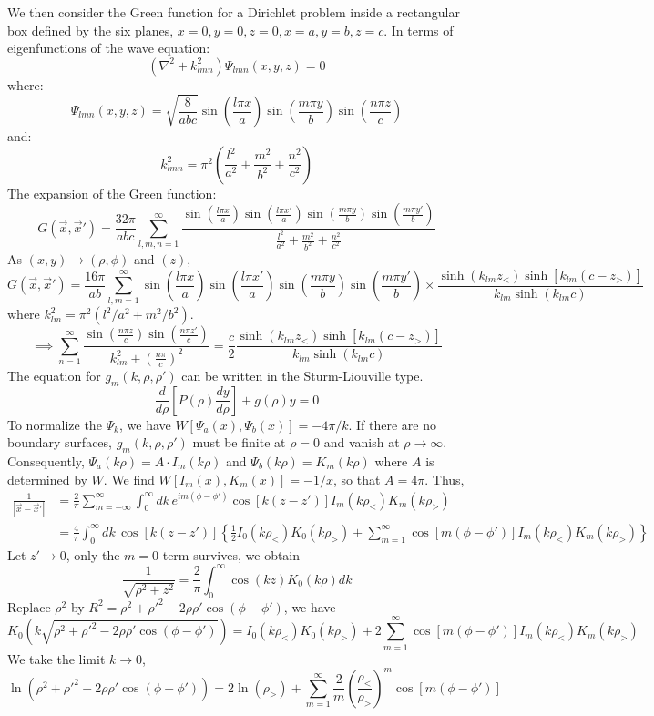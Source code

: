 \documentclass{article}
\begin{document}
	We then consider the Green function for a Dirichlet problem inside a rectangular box defined by the six planes, $x=0, y=0, z=0, x=a, y=b, z=c$.
	In terms of eigenfunctions of the wave equation:
	\[
	(\nabla^2 + k_{lmn}^2)\Psi_{lmn}(x,y,z) = 0
	\]
	where:
	\[
	\Psi_{lmn}(x,y,z) = \sqrt{\frac{8}{abc}} \sin\left(\frac{l\pi x}{a}\right) \sin\left(\frac{m\pi y}{b}\right) \sin\left(\frac{n\pi z}{c}\right)
	\]
	and:
	\[
	k_{lmn}^2 = \pi^2 \left(\frac{l^2}{a^2} + \frac{m^2}{b^2} + \frac{n^2}{c^2}\right)
	\]
	The expansion of the Green function:
	\[
	G(\vec{x}, \vec{x}') = \frac{32\pi}{abc} \sum_{l,m,n=1}^{\infty} \frac{\sin(\frac{l\pi x}{a})\sin(\frac{l\pi x'}{a})\sin(\frac{m\pi y}{b})\sin(\frac{m\pi y'}{b})}{\frac{l^2}{a^2} + \frac{m^2}{b^2} + \frac{n^2}{c^2}}
	\]
	As $(x,y) \to (\rho, \phi)$ and $(z)$,
	\[
	G(\vec{x}, \vec{x}') = \frac{16\pi}{ab} \sum_{l,m=1}^{\infty} \sin\left(\frac{l\pi x}{a}\right)\sin\left(\frac{l\pi x'}{a}\right)\sin\left(\frac{m\pi y}{b}\right)\sin\left(\frac{m\pi y'}{b}\right) \times \frac{\sinh(k_{lm} z_<) \sinh[k_{lm}(c-z_>)]}{k_{lm} \sinh(k_{lm} c)}
	\]
	where $k_{lm}^2 = \pi^2(l^2/a^2 + m^2/b^2)$.
	\[
	\implies \sum_{n=1}^{\infty} \frac{\sin(\frac{n\pi z}{c}) \sin(\frac{n\pi z'}{c})}{k_{lm}^2 + (\frac{n\pi}{c})^2} = \frac{c}{2} \frac{\sinh(k_{lm} z_<) \sinh[k_{lm}(c-z_>)]}{k_{lm} \sinh(k_{lm} c)}
	\]
	The equation for $g_m(k, \rho, \rho')$ can be written in the Sturm-Liouville type.
	\[
	\frac{d}{d\rho}\left[ P(\rho) \frac{dy}{d\rho} \right] + g(\rho)y = 0
	\]
	To normalize the $\Psi_k$, we have $W[\Psi_a(x), \Psi_b(x)] = -4\pi/k$.
	If there are no boundary surfaces, $g_m(k, \rho, \rho')$ must be finite at $\rho=0$ and vanish at $\rho \to \infty$.
	Consequently, $\Psi_a(k\rho) = A \cdot I_m(k\rho)$ and $\Psi_b(k\rho) = K_m(k\rho)$ where $A$ is determined by $W$. We find $W[I_m(x), K_m(x)] = -1/x$, so that $A=4\pi$.
	Thus,
	\begin{align*}
		\frac{1}{|\vec{x} - \vec{x}'|} &= \frac{2}{\pi} \sum_{m=-\infty}^{\infty} \int_0^\infty dk \, e^{im(\phi - \phi')} \cos[k(z-z')] I_m(k\rho_<)K_m(k\rho_>) \\
		&= \frac{4}{\pi} \int_0^\infty dk \, \cos[k(z-z')] \left\{ \frac{1}{2} I_0(k\rho_<)K_0(k\rho_>) + \sum_{m=1}^{\infty} \cos[m(\phi-\phi')] I_m(k\rho_<)K_m(k\rho_>) \right\}
	\end{align*}
	Let $z' \to 0$, only the $m=0$ term survives, we obtain
	\[
	\frac{1}{\sqrt{\rho^2+z^2}} = \frac{2}{\pi} \int_0^\infty \cos(kz) K_0(k\rho) dk
	\]
	Replace $\rho^2$ by $R^2 = \rho^2+\rho'^2-2\rho\rho'\cos(\phi-\phi')$, we have
	\[
	K_0(k\sqrt{\rho^2+\rho'^2-2\rho\rho'\cos(\phi-\phi')}) = I_0(k\rho_<)K_0(k\rho_>) + 2\sum_{m=1}^{\infty} \cos[m(\phi-\phi')] I_m(k\rho_<)K_m(k\rho_>)
	\]
	We take the limit $k\to 0$,
	\[
	\ln\left(\rho^2+\rho'^2-2\rho\rho'\cos(\phi-\phi')\right) = 2\ln(\rho_>) + \sum_{m=1}^{\infty} \frac{2}{m} \left(\frac{\rho_<}{\rho_>}\right)^m \cos[m(\phi-\phi')]
	\]
	
\end{document}
